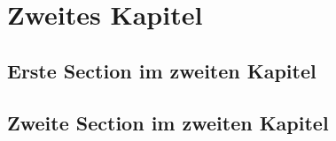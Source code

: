\chapter{Zweites Kapitel}
	
	\blindtext
	\section{Erste Section im zweiten Kapitel}
	\blindtext
	\section{Zweite Section im zweiten Kapitel}
	\blindtext